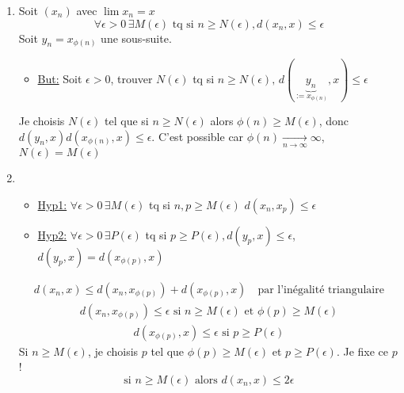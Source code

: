 \begin{preuve}
   \begin{enumerate}
       \item Soit $(x_n)$ avec  $\lim x_n = x$
            \[
                \forall \epsilon > 0 \, \exists M(\epsilon) \text{ tq si } n \ge N(\epsilon), d(x_n ,x) \le \epsilon 
           \] 
           Soit $y_n = x_{\phi(n)}$ une sous-suite.
           \begin{itemize}
               \item \underline{But:} Soit $\epsilon > 0$, trouver $N(\epsilon)$ tq si  $n \ge  N(\epsilon), \, d(\underbrace{y_n}_{:= x_{\phi(n)}}, x) \le \epsilon$
           \end{itemize}
           Je choisis $N(\epsilon)$ tel que si  $n \ge N(\epsilon)$ alors $\phi(n) \ge M(\epsilon)$, donc $d(y_n, x) d(x_{\phi(n)}, x) \le  \epsilon$. C'est possible car $\phi(n) \xrightarrow[n \to \infty]{} \infty$, $N(\epsilon) = M(\epsilon)$ 
        \item 
            \begin{itemize}
                \item  \underline{Hyp1:} $\forall \epsilon > 0 \, \exists M(\epsilon)$ tq si $n, p \ge M(\epsilon)$ $d(x_n, x_p) \le \epsilon$
                \item  \underline{Hyp2:} $\forall \epsilon > 0 \, \exists P(\epsilon)$ tq si $p \ge P(\epsilon), d(y_p, x) \le \epsilon$, $d(y_p, x) = d(x_{\phi(p)}, x)$
            \end{itemize}
            \begin{align*}
                d(x_n, x) \le d(x_n, x_{\phi(p)}) + d(x_{\phi(p)}, x) \quad \text{par l'inégalité triangulaire}
            \end{align*}
            \begin{align*}
                d(x_n, x_{\phi(p)}) \le \epsilon \text{ si } n \ge M(\epsilon) \text{ et } \phi(p) \ge M(\epsilon)
            \end{align*}
            \begin{align*}
                d(x_{\phi(p)}, x) \le \epsilon \text{ si } p \ge P(\epsilon)
            \end{align*}
            Si $n \ge M(\epsilon)$, je choisis $p$ tel que  $\phi(p) \ge  M(\epsilon)$ et $p \ge P(\epsilon)$. Je fixe ce $p$!
             \[
            \text{si } n \ge M(\epsilon) \text{ alors } d(x_n, x) \le 2\epsilon
            \] 
   \end{enumerate} 
\end{preuve}

